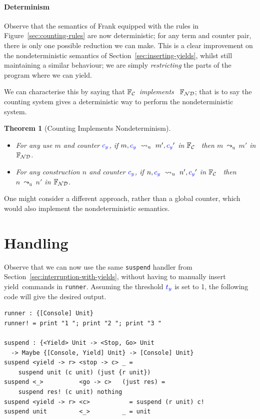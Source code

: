 \documentclass[msc,deptreport,cs]{infthesis} %
\newtheorem{theorem}{Theorem}
\newcommand{\code}[1]{\lstinline{#1}}
\newcommand\nondetfrank{$\mathbb{F}_{\cal{ND}}$}
\newcommand\countingfrank{$\mathbb{F}_{\cal{C}}$}
\newcommand{\counter}{{\color{blue}c_y}}
\newcommand{\threshc}{{\color{blue} t_y}}
\newcommand\yield{\textsf{yield}\xspace}
\newcommand{\redtou}{\leadsto_{\mathrm{u}}}
\begin{document}
\paragraph*{Determinism}
Observe that the semantics of Frank equipped with the rules in
Figure~\ref{sec:counting-rules} are now deterministic; for any term and counter
pair, there is only one possible reduction we can make. This is a clear
improvement on the nondeterministic semantics of Section~\ref{sec:inserting-yields},
whilst still maintaining a similar behaviour; we are simply \emph{restricting}
the parts of the program where we can yield.

We can characterise this by saying that \countingfrank~\emph{implements}~
\nondetfrank; that is to say the counting system gives a deterministic way to
perform the nondeterministic system.

\begin{theorem}[Counting Implements Nondeterminism]
\begin{itemize}
\item For any use $m$ and counter $\counter$, if $m, \counter~\redtou~
  m',\counter'$ in \countingfrank~ then $m~\redtou~m'$ in \nondetfrank.
\item For any construction $n$ and counter $\counter$, if $n, \counter~\redtou~
  n',\counter'$ in \countingfrank~ then $n~\redtou~n'$ in \nondetfrank.
\end{itemize}
\end{theorem}

One might consider a different approach, rather than a global counter, which
would also implement the nondeterministic semantics.

\section{Handling}
\label{sec:handling}

Observe that we can now use the same \code{suspend} handler from
Section~\ref{sec:interruption-with-yields}, without having to manually insert
\yield~commands in \code{runner}. Assuming the threshold $\threshc$ is set to 1, the
following code will give the desired output.

\begin{lstlisting}
runner : {[Console] Unit}
runner! = print "1 "; print "2 "; print "3 "

suspend : {<Yield> Unit -> <Stop, Go> Unit
  -> Maybe {[Console, Yield] Unit} -> [Console] Unit}
suspend <yield -> r> <stop -> c> _ =
    suspend unit (c unit) (just {r unit})
suspend <_>          <go -> c>   (just res) =
    suspend res! (c unit) nothing
suspend <yield -> r> <c>           = suspend (r unit) c!
suspend unit         <_>         _ = unit
\end{lstlisting}
\end{document}
